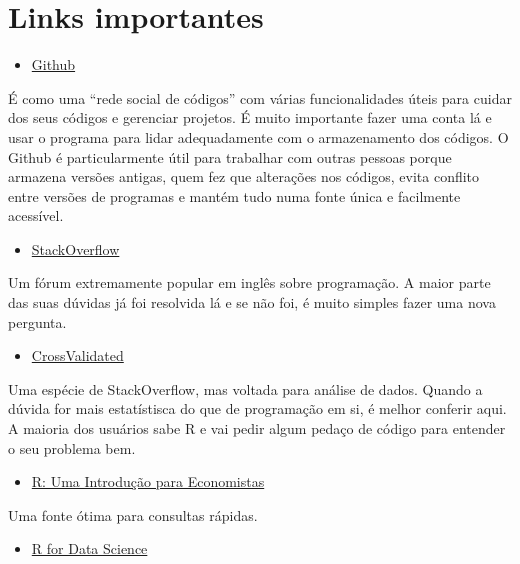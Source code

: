 \documentclass[
]{article}
\providecommand{\tightlist}{%
  \setlength{\itemsep}{0pt}\setlength{\parskip}{0pt}}
\begin{document}
\hypertarget{links-importantes}{%
\section{Links importantes}\label{links-importantes}}

\begin{itemize}
\tightlist
\item
  \href{https://github.com}{Github}
\end{itemize}

É como uma ``rede social de códigos'' com várias funcionalidades úteis
para cuidar dos seus códigos e gerenciar projetos. É muito importante
fazer uma conta lá e usar o programa para lidar adequadamente com o
armazenamento dos códigos. O Github é particularmente útil para
trabalhar com outras pessoas porque armazena versões antigas, quem fez
que alterações nos códigos, evita conflito entre versões de programas e
mantém tudo numa fonte única e facilmente acessível.

\begin{itemize}
\tightlist
\item
  \href{https://stackoverflow.com/}{StackOverflow}
\end{itemize}

Um fórum extremamente popular em inglês sobre programação. A maior parte
das suas dúvidas já foi resolvida lá e se não foi, é muito simples fazer
uma nova pergunta.

\begin{itemize}
\tightlist
\item
  \href{https://stats.stackexchange.com/}{CrossValidated}
\end{itemize}

Uma espécie de StackOverflow, mas voltada para análise de dados. Quando
a dúvida for mais estatístisca do que de programação em si, é melhor
conferir aqui. A maioria dos usuários sabe R e vai pedir algum pedaço de
código para entender o seu problema bem.

\begin{itemize}
\tightlist
\item
  \href{https://danmrc.github.io/R-para-Economistas/}{R: Uma Introdução
  para Economistas}
\end{itemize}

Uma fonte ótima para consultas rápidas.

\begin{itemize}
\tightlist
\item
  \href{https://r4ds.had.co.nz}{R for Data Science}
\end{itemize}
\end{document}
